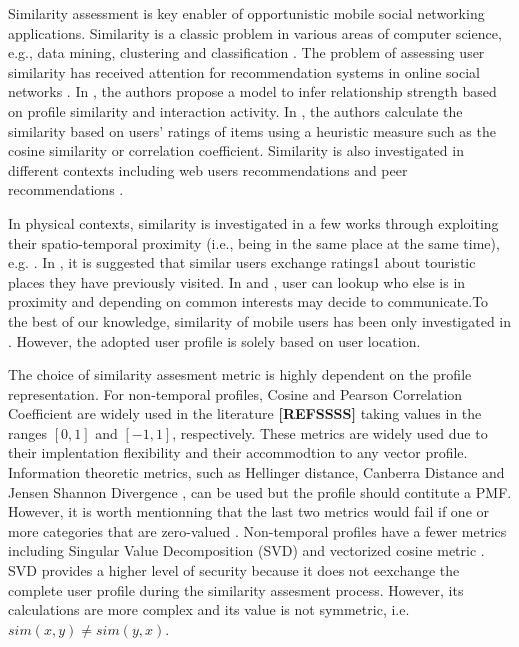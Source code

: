 \documentclass{elsarticle}
\begin{document}
Similarity assessment is key enabler of opportunistic mobile social
networking applications. Similarity is a classic problem in various
areas of computer science, e.g., data mining, clustering and classification
\citet{dm1,dm2}. The problem of assessing user similarity has received
attention for recommendation systems in online social networks \citet{soc1,soc2,cf,p2p}.
In \citet{soc1}, the authors propose a model to infer relationship
strength based on profile similarity and interaction activity. In
\citet{soc2}, the authors calculate the similarity based on users'
ratings of items using a heuristic measure such as the cosine similarity
or correlation coefficient. Similarity is also investigated in different
contexts including web users recommendations \citet{cf} and peer
recommendations \citet{p2p}. 

In physical contexts, similarity is investigated in a few works through
exploiting their spatio-temporal proximity (i.e., being in the same
place at the same time), e.g. \citet{lbd,ms,stp}. In \citet{stp},
it is suggested that similar users exchange ratings1 about touristic
places they have previously visited. In \citet{lbd} and \citet{ms},
user can lookup who else is in proximity and depending on common interests
may decide to communicate.To the best of our knowledge, similarity
of mobile users has been only investigated in \citet{lbd,ms,loc1,loc2}.
However, the adopted user profile is solely based on user location. 

The choice of similarity assesment metric is highly dependent on the
profile representation. For non-temporal profiles, Cosine and Pearson
Correlation Coefficient are widely used in the literature \textbf{{[}REFSSSS{]}}
taking values in the ranges $[0,1]$ and $[-1,1]$, respectively.
These metrics are widely used due to their implentation flexibility
and their accommodtion to any vector profile. Information theoretic
metrics, such as Hellinger distance, Canberra Distance and Jensen
Shannon Divergence \citet{sm}, can be used but the profile should
contitute a PMF. However, it is worth mentionning that the last two
metrics would fail if one or more categories that are zero-valued
\citet{Mai13}. Non-temporal profiles have a fewer metrics including
Singular Value Decomposition (SVD) \citet{csi} and vectorized cosine
metric \citet{Mai13}. SVD provides a higher level of security because
it does not eexchange the complete user profile during the similarity
assesment process. However, its calculations are more complex and
its value is not symmetric, i.e. $sim(x,y)\neq sim(y,x)$. 
\end{document}
